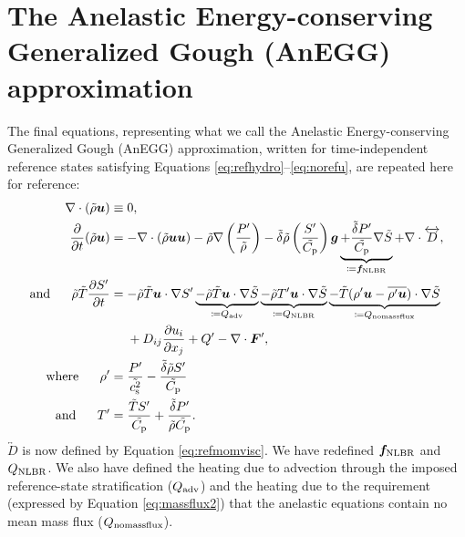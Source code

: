 \documentclass[12pt]{article}
\newcommand{\vecf}{\bm{F}}
\newcommand{\heatnlbr}{Q_{\rm NLBR}}
\newcommand{\forcenlbr}{\bm{f}_{\rm NLBR}}
\newcommand{\heatnomassflux}{Q_{\rm nomassflux}}
\newcommand{\heatadv}{Q_{\rm adv}}
\begin{document}
\section{The Anelastic Energy-conserving Generalized Gough (AnEGG) approximation}\label{sec:anegg}
The final equations, representing what we call the Anelastic Energy-conserving Generalized Gough (AnEGG) approximation, written for time-independent reference states satisfying Equations \eqref{eq:refhydro}--\eqref{eq:norefu}, are repeated here for reference:
\begin{subequations}\label{eq:egg}
\begin{align}
	\Div(\rhotilde\vecu)&\equiv 0\label{eq:eggcont},\\
	\pderiv{}{t}(\rhotilde\vecu)&=-\Div(\rhotilde\vecu\vecu) -\rhotilde\nabla\left(\frac{\prsprime}{\rhotilde}\right) - \deltatilde \rhotilde \left(\frac{\entrprime}{\cptilde}\right) \vecg \underbrace{+ \frac{\deltatilde  \prsprime}{\cptilde} \nabla\entrtilde}_{\define \forcenlbr}+\Div \overleftrightarrow{D},\label{eq:eggmom}\\	
		\andd \rhotilde\tmptilde\pderiv{\entrprime}{t}&= -\rhotilde\tmptilde\ugrad \entrprime \underbrace{- \rhotilde\tmptilde \ugrad \entrtilde}_{\define\heatadv} \underbrace{ -  \rhotilde \tmpprime\ugrad\entrtilde }_{\define \heatnlbr} 
		\underbrace{- \tmptilde(\rhoprime \vecu-\overline{\rhoprime\vecu})\cdot\nabla\entrtilde}_{\define\heatnomassflux} \nonumber\\
		&\ \ \ \ +D_{ij}\pderiv{u_i}{x_j} + Q^\prime- \Div\vecf^\prime,\label{eq:eggen}\\
	\where \rhoprime &= \frac{\prsprime}{\cssqtilde}-\frac{\deltatilde\rhotilde \entrprime}{\cptilde}\label{eq:eggenrhoprime}\\
\andd \tmpprime &=  \frac{\tmptilde \entrprime}{\cptilde} + \frac{\deltatilde \prsprime}{\rhotilde\cptilde}.\label{eq:eggentmpprime}
\end{align}
\end{subequations}
$\overleftrightarrow{D}$ is now defined by Equation \eqref{eq:refmomvisc}. We have redefined $\forcenlbr$ and $\heatnlbr$. We also have defined the heating due to advection through the imposed reference-state stratification ($\heatadv$) and the heating due to the requirement (expressed by Equation \eqref{eq:massflux2}) that the anelastic equations contain no mean mass flux ($\heatnomassflux$).  %
\end{document}
